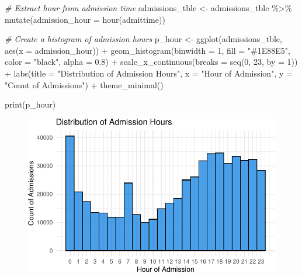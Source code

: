 \documentclass[
]{article}
\newenvironment{Shaded}{\begin{snugshade}}{\end{snugshade}}
\newcommand{\AttributeTok}[1]{\textcolor[rgb]{0.77,0.63,0.00}{#1}}
\newcommand{\CommentTok}[1]{\textcolor[rgb]{0.56,0.35,0.01}{\textit{#1}}}
\newcommand{\DecValTok}[1]{\textcolor[rgb]{0.00,0.00,0.81}{#1}}
\newcommand{\FloatTok}[1]{\textcolor[rgb]{0.00,0.00,0.81}{#1}}
\newcommand{\FunctionTok}[1]{\textcolor[rgb]{0.00,0.00,0.00}{#1}}
\newcommand{\NormalTok}[1]{\textcolor[rgb]{0.00,0.00,0.00}{#1}}
\newcommand{\OtherTok}[1]{\textcolor[rgb]{0.56,0.35,0.01}{#1}}
\newcommand{\SpecialCharTok}[1]{\textcolor[rgb]{0.00,0.00,0.00}{#1}}
\newcommand{\StringTok}[1]{\textcolor[rgb]{0.31,0.60,0.02}{#1}}
\begin{document}
\begin{Shaded}
\begin{Highlighting}[]
\CommentTok{\# Extract hour from admission time}
\NormalTok{admissions\_tble }\OtherTok{\textless{}{-}}\NormalTok{ admissions\_tble }\SpecialCharTok{\%\textgreater{}\%}
  \FunctionTok{mutate}\NormalTok{(}\AttributeTok{admission\_hour =} \FunctionTok{hour}\NormalTok{(admittime))}

\CommentTok{\# Create a histogram of admission hours}
\NormalTok{p\_hour }\OtherTok{\textless{}{-}} \FunctionTok{ggplot}\NormalTok{(admissions\_tble, }\FunctionTok{aes}\NormalTok{(}\AttributeTok{x =}\NormalTok{ admission\_hour)) }\SpecialCharTok{+}
  \FunctionTok{geom\_histogram}\NormalTok{(}\AttributeTok{binwidth =} \DecValTok{1}\NormalTok{, }\AttributeTok{fill =} \StringTok{"\#1E88E5"}\NormalTok{, }
                 \AttributeTok{color =} \StringTok{"black"}\NormalTok{, }\AttributeTok{alpha =} \FloatTok{0.8}\NormalTok{) }\SpecialCharTok{+}
  \FunctionTok{scale\_x\_continuous}\NormalTok{(}\AttributeTok{breaks =} \FunctionTok{seq}\NormalTok{(}\DecValTok{0}\NormalTok{, }\DecValTok{23}\NormalTok{, }\AttributeTok{by =} \DecValTok{1}\NormalTok{)) }\SpecialCharTok{+}
  \FunctionTok{labs}\NormalTok{(}\AttributeTok{title =} \StringTok{"Distribution of Admission Hours"}\NormalTok{,}
       \AttributeTok{x =} \StringTok{"Hour of Admission"}\NormalTok{,}
       \AttributeTok{y =} \StringTok{"Count of Admissions"}\NormalTok{) }\SpecialCharTok{+}
  \FunctionTok{theme\_minimal}\NormalTok{()}

\FunctionTok{print}\NormalTok{(p\_hour)}
\end{Highlighting}
\end{Shaded}

\begin{figure}[H]

{\centering \includegraphics{hw3_files/figure-pdf/unnamed-chunk-24-1.pdf}

}

\end{figure}
\end{document}
